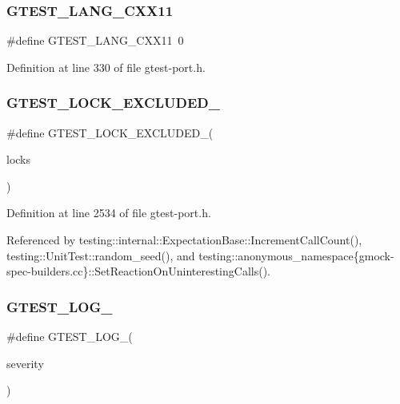 \subsubsection{\texorpdfstring{G\+T\+E\+S\+T\+\_\+\+L\+A\+N\+G\+\_\+\+C\+X\+X11}{GTEST\_LANG\_CXX11}}
{\footnotesize\ttfamily \#define G\+T\+E\+S\+T\+\_\+\+L\+A\+N\+G\+\_\+\+C\+X\+X11~0}



Definition at line 330 of file gtest-\/port.\+h.

\mbox{\label{gtest-port_8h_a69abff5a4efdd07bd5faebe3dd318d06}} 
\subsubsection{\texorpdfstring{G\+T\+E\+S\+T\+\_\+\+L\+O\+C\+K\+\_\+\+E\+X\+C\+L\+U\+D\+E\+D\+\_\+}{GTEST\_LOCK\_EXCLUDED\_}}
{\footnotesize\ttfamily \#define G\+T\+E\+S\+T\+\_\+\+L\+O\+C\+K\+\_\+\+E\+X\+C\+L\+U\+D\+E\+D\+\_\+(\begin{DoxyParamCaption}\item[{}]{locks }\end{DoxyParamCaption})}



Definition at line 2534 of file gtest-\/port.\+h.



Referenced by testing\+::internal\+::\+Expectation\+Base\+::\+Increment\+Call\+Count(), testing\+::\+Unit\+Test\+::random\+\_\+seed(), and testing\+::anonymous\+\_\+namespace\{gmock-\/spec-\/builders.\+cc\}\+::\+Set\+Reaction\+On\+Uninteresting\+Calls().

\mbox{\label{gtest-port_8h_a8ef4cb4c465db8c15464aecc6d9510ef}} 
\subsubsection{\texorpdfstring{G\+T\+E\+S\+T\+\_\+\+L\+O\+G\+\_\+}{GTEST\_LOG\_}}
{\footnotesize\ttfamily \#define G\+T\+E\+S\+T\+\_\+\+L\+O\+G\+\_\+(\begin{DoxyParamCaption}\item[{}]{severity }\end{DoxyParamCaption})}

